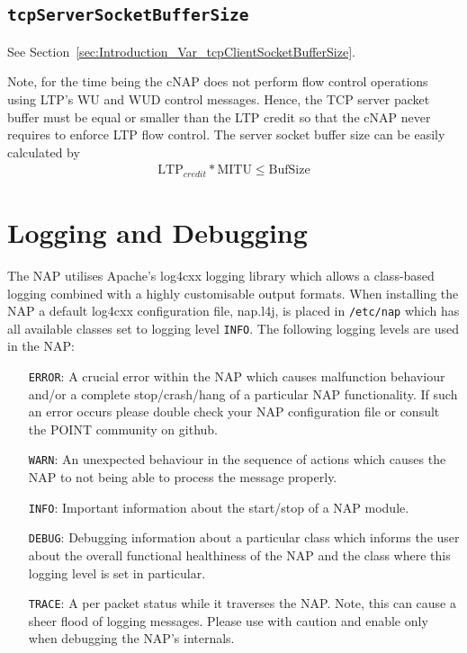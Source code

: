\documentclass[a4paper,11pt,titlepage]{report}
\begin{document}
\subsection{\texttt{tcpServerSocketBufferSize}}\label{sec:Introduction_Var_tcpServerSocketBufferSize}
See Section~\ref{sec:Introduction_Var_tcpClientSocketBufferSize}.

Note, for the time being the \ac{cNAP} does not perform flow control operations using \ac{LTP}'s \ac{WU} and \ac{WUD} control messages. Hence, the \ac{TCP} server packet buffer must be equal or smaller than the \ac{LTP} credit so that the \ac{cNAP} never requires to enforce \ac{LTP} flow control. The server socket buffer size can be easily calculated by
%
\begin{eqnarray}
\text{LTP}_{credit} * \text{MITU} \le \text{BufSize}\label{eq:TCP_SERVER_SOCKET_BUFFER_SIZE}
\end{eqnarray}

\section{Logging and Debugging}\label{sec:Introduction_Logging}
The \ac{NAP} utilises Apache's log4cxx logging library which allows a class-based logging combined with a highly customisable output formats. When installing the \ac{NAP} a default log4cxx configuration file, nap.l4j, is placed in \texttt{/etc/nap} which has all available classes set to logging level \texttt{INFO}. The following logging levels are used in the \ac{NAP}:
\begin{itemize}
	\item[\texttt{ERROR}:] A crucial error within the \ac{NAP} which causes malfunction behaviour and/or a complete stop/crash/hang of a particular \ac{NAP} functionality. If such an error occurs please double check your \ac{NAP} configuration file or consult the POINT community on github.
	\item[\texttt{WARN}:] An unexpected behaviour in the sequence of actions which causes the \ac{NAP} to not being able to process the message properly. 
	\item[\texttt{INFO}:] Important information about the start/stop of a \ac{NAP} module.
	\item[\texttt{DEBUG}:] Debugging information about a particular class which informs the user about the overall functional healthiness of the \ac{NAP} and the class where this logging level is set in particular.
	\item[\texttt{TRACE}:] A per packet status while it traverses the \ac{NAP}. Note, this can cause a sheer flood of logging messages. Please use with caution and enable only when debugging the \ac{NAP}'s internals.
\end{itemize}
\end{document}
